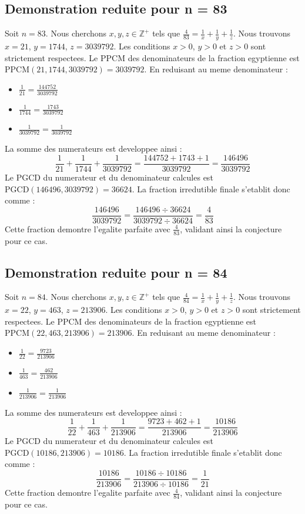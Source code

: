 \documentclass[11pt,a4paper]{article}
\begin{document}
\subsection{Demonstration reduite pour n = 83}
Soit $n = 83$. Nous cherchons $x, y, z \in \mathbb{Z}^{+}$ tels que $\frac{4}{83} = \frac{1}{x} + \frac{1}{y} + \frac{1}{z}$.
Nous trouvons $x = 21$, $y = 1744$, $z = 3039792$.
Les conditions $x > 0$, $y > 0$ et $z > 0$ sont strictement respectees.
Le PPCM des denominateurs de la fraction egyptienne est $\text{PPCM}(21, 1744, 3039792) = 3039792$.
En reduisant au meme denominateur :
\begin{itemize}
    \item $\frac{1}{21} = \frac{144752}{3039792}$
    \item $\frac{1}{1744} = \frac{1743}{3039792}$
    \item $\frac{1}{3039792} = \frac{1}{3039792}$
\end{itemize}
La somme des numerateurs est developpee ainsi :
$$ \frac{1}{21} + \frac{1}{1744} + \frac{1}{3039792} = \frac{144752 + 1743 + 1}{3039792} = \frac{146496}{3039792} $$
Le PGCD du numerateur et du denominateur calcules est $\text{PGCD}(146496, 3039792) = 36624$.
La fraction irredutible finale s'etablit donc comme :
$$ \frac{146496}{3039792} = \frac{146496 \div 36624}{3039792 \div 36624} = \frac{4}{83} $$
Cette fraction demontre l'egalite parfaite avec $\frac{4}{83}$, validant ainsi la conjecture pour ce cas.

\subsection{Demonstration reduite pour n = 84}
Soit $n = 84$. Nous cherchons $x, y, z \in \mathbb{Z}^{+}$ tels que $\frac{4}{84} = \frac{1}{x} + \frac{1}{y} + \frac{1}{z}$.
Nous trouvons $x = 22$, $y = 463$, $z = 213906$.
Les conditions $x > 0$, $y > 0$ et $z > 0$ sont strictement respectees.
Le PPCM des denominateurs de la fraction egyptienne est $\text{PPCM}(22, 463, 213906) = 213906$.
En reduisant au meme denominateur :
\begin{itemize}
    \item $\frac{1}{22} = \frac{9723}{213906}$
    \item $\frac{1}{463} = \frac{462}{213906}$
    \item $\frac{1}{213906} = \frac{1}{213906}$
\end{itemize}
La somme des numerateurs est developpee ainsi :
$$ \frac{1}{22} + \frac{1}{463} + \frac{1}{213906} = \frac{9723 + 462 + 1}{213906} = \frac{10186}{213906} $$
Le PGCD du numerateur et du denominateur calcules est $\text{PGCD}(10186, 213906) = 10186$.
La fraction irredutible finale s'etablit donc comme :
$$ \frac{10186}{213906} = \frac{10186 \div 10186}{213906 \div 10186} = \frac{1}{21} $$
Cette fraction demontre l'egalite parfaite avec $\frac{4}{84}$, validant ainsi la conjecture pour ce cas.
\end{document}
